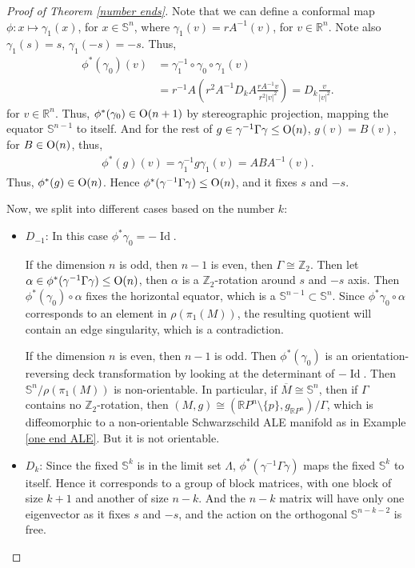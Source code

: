 \documentclass[12pt]{amsart}
\theoremstyle{definition}
\begin{document}
\begin{proof}[Proof of Theorem \ref{number ends}]
Note that we can define a conformal map $\phi:x\mapsto \gamma_1(x)$, for $x\in \mathbb{S}^n$, where $\gamma_1(v)=rA^{-1}(v)$, for $v\in\mathbb{R}^n$. Note also $\gamma_1(s)=s$, $\gamma_1(-s)=-s$. Thus, 
\begin{align*}
    \phi^*(\gamma_0)(v)&=\gamma_1^{-1}\circ\gamma_0\circ\gamma_1(v)\\
    &=r^{-1}A(r^2 A^{-1}D_k A\frac{r A^{-1}v}{r^2|v|^2})=D_k \frac{v}{|v|^2}.
\end{align*}
for $v\in\mathbb{R}^n$. Thus, $\phi^*(\gamma_0)\in {\rm{O}}(n+1)$ by stereographic projection, mapping the equator $\mathbb{S}^{n-1}$ to itself. And for the rest of $g\in \gamma^{-1}\Gamma\gamma\leq {\rm{O}}(n)$, $g(v)=B(v)$, for $B\in {\rm{O}}(n)$, thus,
\begin{align*}
    \phi^*(g)(v)=\gamma_1^{-1}g\gamma_1(v)=ABA^{-1}(v).
\end{align*}
Thus, $\phi^*(g)\in {\rm{O}}(n)$. Hence $\phi^*(\gamma^{-1}\Gamma\gamma)\leq {\rm{O}}(n)$, and it fixes $s$ and $-s$.

Now, we split into different cases based on the number $k$:

\begin{itemize}
    \item $D_{-1}$: In this case $\phi^*\gamma_0=-\operatorname{Id}$.
    
    If the dimension $n$ is odd, then $n-1$ is even, then $\Gamma\cong \mathbb{Z}_2$. Then let $\alpha\in \phi^*(\gamma^{-1}\Gamma\gamma)\leq {\rm{O}}(n)$, then $\alpha$ is a $\mathbb{Z}_2$-rotation around $s$ and $-s$ axis. Then $\phi^*(\gamma_0)\circ \alpha$ fixes the horizontal equator, which is a $\mathbb{S}^{n-1}\subset\mathbb{S}^{n}$. Since $\phi^*\gamma_0\circ\alpha$ corresponds to an element in $\rho(\pi_1(M))$, the resulting quotient will contain an edge singularity, which is a contradiction.

    If the dimension $n$ is even, then $n-1$ is odd. Then $\phi^*(\gamma_0)$ is an orientation-reversing deck transformation by looking at the determinant of $-\operatorname{Id}$. Then $\mathbb{S}^n/\rho(\pi_1(M))$ is non-orientable. In particular, if $\overline{M}\cong \mathbb{S}^n$, then if $\Gamma$ contains no $\mathbb{Z}_2$-rotation, then $(M,g)\cong (\mathbb{R}P^n\setminus\{p\},g_{\mathbb{R}P^n})/\Gamma$, which is diffeomorphic to a non-orientable Schwarzschild ALE manifold as in Example \ref{one end ALE}. But it is not orientable.
    
    \item $D_k$: Since the fixed $\mathbb{S}^k$ is in the limit set $\Lambda$, $\phi^*(\gamma^{-1}\Gamma\gamma)$ maps the fixed $\mathbb{S}^k$ to itself. Hence it corresponds to a group of block matrices, with one block of size $k+1$ and another of size $n-k$. And the $n-k$ matrix will have only one eigenvector as it fixes $s$ and $-s$, and the action on the orthogonal $\mathbb{S}^{n-k-2}$ is free.
    

\end{itemize}
\end{proof}
\end{document}
